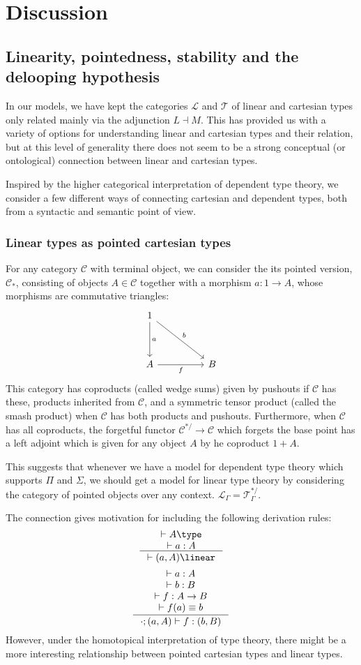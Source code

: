   \section{Discussion}\label{discussion}
  \subsection{Linearity, pointedness, stability and the delooping hypothesis}
  In our models, we have kept the categories $\mathcal{L}$ and $\mathcal{T}$ of linear and cartesian types only related mainly via the adjunction $L \dashv M$. This has provided us with a variety of options for understanding linear and cartesian types and their relation, but at this level of generality there does not seem to be a strong conceptual (or ontological) connection between linear and cartesian types.

  Inspired by the higher categorical interpretation of dependent type theory, we consider a few different ways of connecting cartesian and dependent types, both from a syntactic and semantic point of view.
  \subsubsection{Linear types as pointed cartesian types}
  For any category $\mathcal{C}$ with terminal object, we can consider the its pointed version, $\mathcal{C}_*$, consisting of objects $A \in \mathcal{C}$ together with a morphism $a : 1 \to A$, whose morphisms are commutative triangles:
\[
  \ti
  1 \ar[d, "a"] \ar[dr, "b"] \\
  A \ar[r, "f",swap]& B
  \kz
\]
This category has coproducts (called wedge sums) given by pushouts if $\mathcal{C}$ has these, products inherited from $\mathcal{C}$, and a symmetric tensor product (called the smash product) when $\mathcal{C}$ has both products and pushouts. Furthermore, when $\mathcal{C}$ has all coproducts, the forgetful functor $\mathcal{C}^{*/} \to \mathcal{C}$ which forgets the base point has a left adjoint which is given for any object $A$ by he coproduct $1 + A$.

This suggests that whenever we have a model for dependent type theory which supports $\Pi$ and $\Sigma$, we should get a model for linear type theory by considering the category of pointed objects over any context. $\mathcal{L}_\Gamma = \mathcal{T}_\Gamma^{*/}$.

The connection gives motivation for including the following derivation rules:
  \[
  \inference{
    \vdash A \type\\
     \vdash a : A}
  {\vdash (a, A) \linear}
\]
\[
  \inference{
     \vdash a : A\\
     \vdash b : B\\
    \vdash f : A \to B\\
    \vdash f(a) \equiv b}
  {\cdot ; (a, A) \vdash f : (b, B)}
\]
However, under the homotopical interpretation of type theory, there might be a more interesting relationship between pointed cartesian types and linear types.
